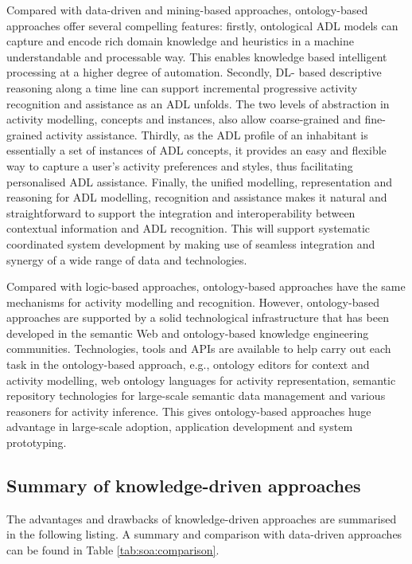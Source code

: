 Compared with data-driven and mining-based approaches, ontology-based approaches offer several compelling features: firstly, ontological ADL models can capture and encode rich domain knowledge and heuristics in a machine understandable and processable way. This enables knowledge based intelligent processing at a higher degree of automation. Secondly, DL- based descriptive reasoning along a time line can support incremental progressive activity recognition and assistance as an ADL unfolds. The two levels of abstraction in activity modelling, concepts and instances, also allow coarse-grained and fine-grained activity assistance. Thirdly, as the ADL profile of an inhabitant is essentially a set of instances of ADL concepts, it provides an easy and flexible way to capture a user’s activity preferences and styles, thus facilitating personalised ADL assistance. Finally, the unified modelling, representation and reasoning for ADL modelling, recognition and assistance makes it natural and straightforward to support the integration and interoperability between contextual information and ADL recognition. This will support systematic coordinated system development by making use of seamless integration and synergy of a wide range of data and technologies. 

Compared with logic-based approaches, ontology-based approaches have the same mechanisms for activity modelling and recognition. However, ontology-based approaches are supported by a solid technological infrastructure that has been developed in the semantic Web and ontology-based knowledge engineering communities. Technologies, tools and APIs are available to help carry out each task in the ontology-based approach, e.g., ontology editors for context and activity modelling, web ontology languages for activity representation, semantic repository technologies for large-scale semantic data management and various reasoners for activity inference. This gives ontology-based approaches huge advantage in large-scale adoption, application development and system prototyping.

\subsection{Summary of knowledge-driven approaches}
The advantages and drawbacks of knowledge-driven approaches are summarised in the following listing. A summary and comparison with data-driven approaches can be found in Table \ref{tab:soa:comparison}.

